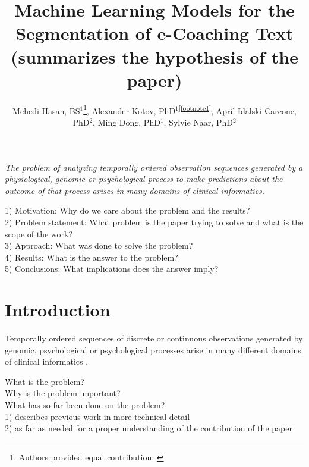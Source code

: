 \documentclass{amia}
\begin{document}
\title{Machine Learning Models for the Segmentation of e-Coaching Text (summarizes the hypothesis of the paper)}

\author{Mehedi Hasan, BS$^{1}$\footnote[1]{Authors provided equal contribution. \label{footnote1}}, Alexander Kotov, PhD$^{1}$\textsuperscript{\ref{footnote1}}, April Idalski Carcone, PhD$^{2}$, Ming Dong, PhD$^{1}$, Sylvie Naar, PhD$^{2}$}


\maketitle

\textit{The problem of analyzing temporally ordered observation sequences generated by a physiological, genomic or psychological process to make predictions about the outcome of that process arises in
many domains of clinical informatics.}

1) Motivation: Why do we care about the problem and the results? \\
2) Problem statement: What problem is the paper trying to solve and what is the scope of the work? \\
3) Approach: What was done to solve the problem? \\
4) Results: What is the answer to the problem? \\
5) Conclusions: What implications does the answer imply?

\section*{Introduction}
Temporally ordered sequences of discrete or continuous observations generated by genomic, psychological or psychological processes arise in many different domains of clinical informatics \cite{kotov2015interpretable}\cite{hasan2016study}.

What is the problem? \\

Why is the problem important? \\

What has so far been done on the  problem?\\
1) describes previous work in more technical detail \\
2) as far as needed for a proper understanding of the contribution of the paper \\
\end{document}
